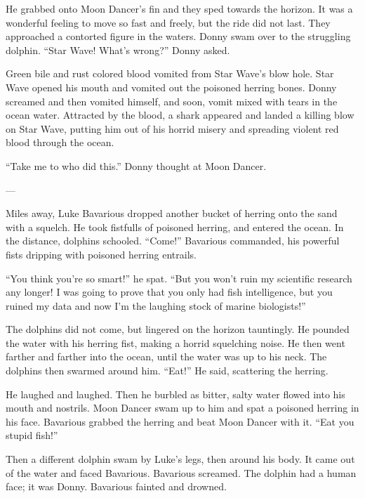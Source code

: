 He grabbed onto Moon Dancer's fin and they sped towards the
horizon. It was a wonderful feeling to move so fast and freely, but
the ride did not last. They approached a contorted figure in the
waters. Donny swam over to the struggling dolphin. ``Star Wave!
What's wrong?'' Donny asked.



Green bile and rust colored blood vomited from Star Wave's blow
hole. Star Wave opened his mouth and vomited out the poisoned
herring bones. Donny screamed and then vomited himself, and soon,
vomit mixed with tears in the ocean water. Attracted by the blood,
a shark appeared and landed a killing blow on Star Wave, putting
him out of his horrid misery and spreading violent red blood
through the ocean.



``Take me to who did this.'' Donny thought at Moon Dancer.



---



Miles away, Luke Bavarious dropped another bucket of herring onto
the sand with a squelch. He took fistfulls of poisoned herring, and
entered the ocean. In the distance, dolphins schooled. ``Come!''
Bavarious commanded, his powerful fists dripping with poisoned
herring entrails.



``You think you're so smart!'' he spat. ``But you won't ruin my
scientific research any longer! I was going to prove that you only
had fish intelligence, but you ruined my data and now I'm the
laughing stock of marine biologists!''



The dolphins did not come, but lingered on the horizon tauntingly.
He pounded the water with his herring fist, making a horrid
squelching noise. He then went farther and farther into the ocean,
until the water was up to his neck. The dolphins then swarmed
around him. ``Eat!'' He said, scattering the herring.



He laughed and laughed. Then he burbled as bitter, salty water
flowed into his mouth and nostrils. Moon Dancer swam up to him and
spat a poisoned herring in his face. Bavarious grabbed the herring
and beat Moon Dancer with it. ``Eat you stupid fish!''



Then a different dolphin swam by Luke's legs, then around his body.
It came out of the water and faced Bavarious. Bavarious screamed.
The dolphin had a human face; it was Donny. Bavarious fainted and
drowned.



